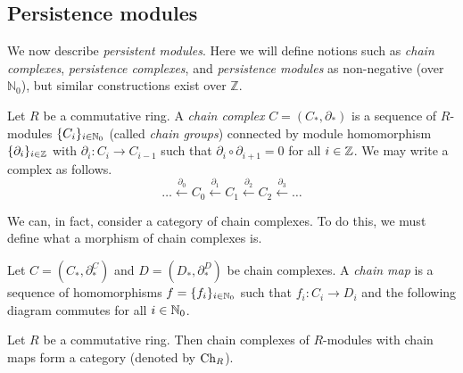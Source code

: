 \subsection{Persistence modules}
\label{ssec:pers_modules}

We now describe \emph{persistent modules}. Here we will define notions such as \emph{chain complexes}, \emph{persistence complexes}, and \emph{persistence modules} as non-negative (over $\mathbb N_0$), but similar constructions exist over $\mathbb Z$. 

\begin{definition}
    Let $R$ be a commutative ring. A \emph{chain complex} $C = (C_*, \partial_*)$ is a sequence of $R$-modules $\{C_i\}_{i \in \mathbb N_0}$ (called \emph{chain groups}) connected by module homomorphism $\{\partial_i\}_{i \in \mathbb Z}$ with $\partial_i: C_i \to C_{i-1}$ such that $\partial_i \circ \partial_{i+1} = 0$ for all $i \in \mathbb Z$. We may write a complex as follows.
    \[ \ldots \xleftarrow{\partial_0} C_0 \xleftarrow{\partial_1} C_1 \xleftarrow{\partial_2} C_2 \xleftarrow{\partial_3} \ldots \]
\end{definition}

We can, in fact, consider a category of chain complexes. To do this, we must define what a morphism of chain complexes is.

\begin{definition}
    Let $C = (C_*,\partial_*^C)$ and $D = (D_*, \partial_*^D)$ be chain complexes. A \emph{chain map} is a sequence of homomorphisms $f = \{f_i\}_{i \in \mathbb N_0}$ such that $f_i: C_i \to D_i$ and the following diagram commutes for all $i \in \mathbb N_0$.
    \begin{center}
    \end{center}
\end{definition}

\begin{lemma}
    Let $R$ be a commutative ring. Then chain complexes of $R$-modules with chain maps form a category (denoted by $\operatorname{Ch}_R$).
\end{lemma}

